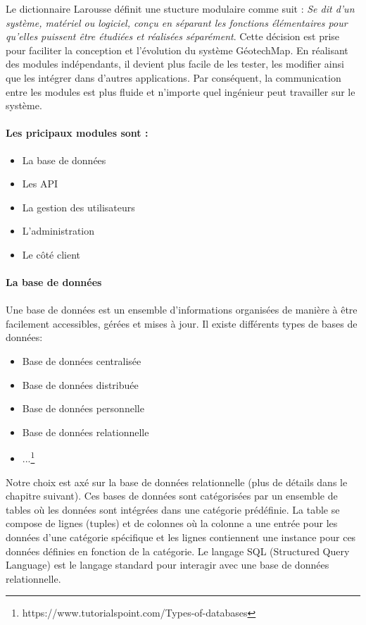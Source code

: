 Le dictionnaire Larousse définit une stucture modulaire comme suit : 
\textit{Se dit d'un système, matériel ou logiciel, conçu en séparant les 
fonctions élémentaires pour qu'elles puissent être étudiées et réalisées séparément}\cite{Larousse}. 
Cette décision est prise pour faciliter la conception et l'évolution du système GéotechMap.
En réalisant des modules indépendants, il devient plus facile de les tester, les modifier 
ainsi que les intégrer dans d'autres applications. Par conséquent, la communication entre les modules 
est plus fluide et n'importe quel ingénieur peut travailler sur le système.
\paragraph{Les pricipaux modules sont :}
\begin{itemize}
        \item La base de données
        \item Les API
        \item La gestion des utilisateurs
        \item L'administration
        \item Le côté client
\end{itemize}
\paragraph{La base de données}
\paragraph{}
Une base de données est un ensemble d'informations organisées de manière 
à être facilement accessibles, gérées et mises à jour. Il existe différents types de bases de données:
\begin{itemize}
        \item Base de données centralisée
        \item Base de données distribuée
        \item Base de données personnelle
        \item Base de données relationnelle
        \item ...\footnote{https://www.tutorialspoint.com/Types-of-databases}
\end{itemize}
Notre choix est axé sur la base de données relationnelle (plus de détails dans le chapitre suivant).
Ces bases de données sont catégorisées par un ensemble de tables où les données 
sont intégrées dans une catégorie prédéfinie. La table se compose de lignes (tuples)
et de colonnes où la colonne a une entrée pour les données d'une catégorie spécifique 
et les lignes contiennent une instance pour ces données définies en fonction de la catégorie. 
Le langage SQL (Structured Query Language) est le langage standard pour interagir avec
 une base de données relationnelle.
